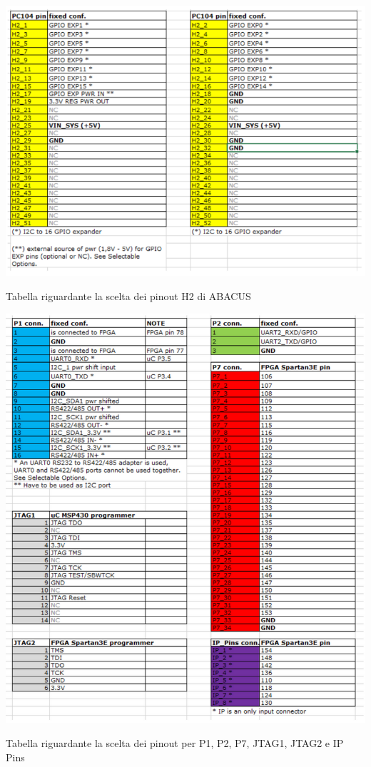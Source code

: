 \documentclass[LaM,binding=0.6cm,oneside]{../sapthesis}
\begin{document}
    \begin{table}[htbp]
    \centerline{\includegraphics[scale=.85]{examples/datasheet/abacusDatasheet8.PNG}}
    \caption{Tabella riguardante la scelta dei pinout H2 di ABACUS}
    \label{fig}
    \end{table}
    
    \begin{table}[htbp]
    \centerline{\includegraphics[scale=.7]{examples/datasheet/abacusDatasheet2.PNG}}
    \caption{Tabella riguardante la scelta dei pinout per P1, P2, P7, JTAG1, JTAG2 e IP Pins}
    \label{fig}
    \end{table} 
    
\end{document}
